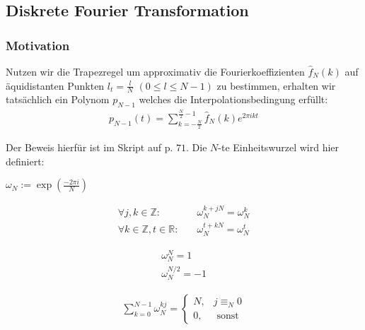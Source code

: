 \newsection
\subsection{Diskrete Fourier Transformation}



\subsubsection{Motivation}

Nutzen wir die Trapezregel um approximativ die Fourierkoeffizienten $\hat{f}_N(k)$ auf äquidistanten Punkten $l_t=\frac{l}{N}$ $(0 \leq l \leq N-1)$ zu bestimmen, erhalten wir tatsächlich ein Polynom $p_{N-1}$ welches die Interpolationsbedingung erfüllt:
\begin{align*}
    p_{N-1}(t) = \sum_{k=-\frac{N}{2}}^{\frac{N}{2}-1} \hat{f}_N(k)e^{2\pi ikt}
\end{align*}

Der Beweis hierfür ist im Skript auf p. $71$. Die $N$-te Einheitswurzel wird hier definiert:

 $\omega_N := \exp(\frac{-2\pi i}{N})$

\begin{multicols}{3}
\begin{align*}
    \forall j,k \in \mathbb{Z}:\quad                 & \omega_N^{k+jN}=\omega_N^k \\
    \forall k \in \mathbb{Z}, t \in \mathbb{R}:\quad & \omega_N^{t+kN}=\omega_N^t 
\end{align*}

\newcolumn
\begin{align*}
    \omega_N^N=1 \\
    \omega_N^{N/2}=-1
\end{align*}

\newcolumn
\begin{align*}
    \sum_{k=0}^{N-1} \omega_N^{kj} = \begin{cases}
        N, & j \equiv_N 0 \\
        0, & \text{ sonst}
    \end{cases}
\end{align*}
\newcolumn
\end{multicols}